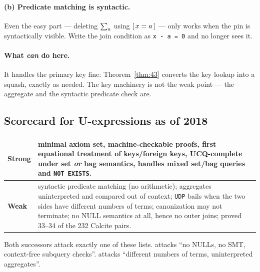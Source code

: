 \paragraph{(b) Predicate matching is syntactic.}
Even the easy part --- deleting $\sum_{a}$ using $[\,x=a\,]$ --- only works when the pin is
syntactically visible. Write the join condition as \lstinline|x - a = 0| and \udp{} no
longer sees it.

\paragraph{What \udp{} \emph{can} do here.}
It handles the primary key fine: Theorem~\ref{thm:43} converts the key lookup into a
squash, exactly as needed. The key machinery is not the weak point --- the aggregate and
the syntactic predicate check are.

\subsection{Scorecard for U-expressions as of 2018}

\begin{table}[h]\centering\small
\begin{tabularx}{\linewidth}{@{}lX@{}}
\toprule
\textbf{Strong} & minimal axiom set, machine-checkable proofs, first equational treatment of
keys/foreign keys, UCQ-complete under set \emph{or} bag semantics, handles mixed
set/bag queries and \lstinline|NOT EXISTS|.\\
\midrule
\textbf{Weak} & syntactic predicate matching (no arithmetic); aggregates uninterpreted and
compared out of context; \lstinline|UDP| bails when the two sides have different numbers of
terms; canonization may not terminate; no NULL semantics at all, hence no outer joins;
proved 33--34 of the 232 Calcite pairs.\\
\bottomrule
\end{tabularx}
\end{table}

Both successors attack exactly one of these lists. \QED{} attacks ``no NULLs, no SMT,
context-free subquery checks''. \sqlsolver{} attacks ``different numbers of terms,
uninterpreted aggregates''.
